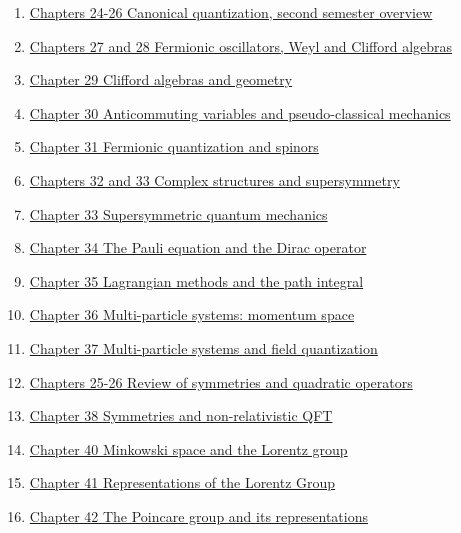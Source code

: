 \documentclass[11pt]{article}
\begin{document}
\begin{enumerate}
	\item	\href{https://mp.weixin.qq.com/s/1SBDkAsAP7Ov3OxvLwbe-g}{Chapters 24-26 Canonical quantization, second semester overview}	%
	\item	\href{https://mp.weixin.qq.com/s/I_jja5bSVY6yQx524kyoTQ}{Chapters 27 and 28 Fermionic oscillators, Weyl and Clifford algebras}	%
	\item	\href{https://mp.weixin.qq.com/s/zefOjiM-Weequ63_DQ9JWg}{Chapter 29 Clifford algebras and geometry} 	%
	\item 	\href{https://mp.weixin.qq.com/s/N3okmt1rshf2J26od2AvGQ}{Chapter 30 Anticommuting variables and pseudo-classical mechanics}	%
	\item 	\href{https://mp.weixin.qq.com/s/S3HAxmVX3YFLlGp7Skl44Q}{Chapter 31 Fermionic quantization and spinors}	%
	\item 	\href{https://mp.weixin.qq.com/s/nHh1YNanToykpK5zKwBfBQ}{Chapters 32 and 33 Complex structures and supersymmetry}	%
	\item 	\href{https://mp.weixin.qq.com/s/5YV2G3epflkIrEPUEVLVig}{Chapter 33 Supersymmetric quantum mechanics}	%
	\item 	\href{https://mp.weixin.qq.com/s/oEaCn-cgkR1csYRlqZJiXw}{Chapter 34 The Pauli equation and the Dirac operator}	%
	\item 	\href{https://mp.weixin.qq.com/s/j9NaXcWyvbgfSPYWFAoMwQ}{Chapter 35 Lagrangian methods and the path integral}	%
	\item 	\href{https://mp.weixin.qq.com/s/ot9_UC_IMNv5PCtrUTVPWg}{Chapter 36 Multi-particle systems: momentum space}	%
	\item	\href{https://mp.weixin.qq.com/s/aJE6pfXsPwbZjTM-ahAJiQ}{Chapter 37 Multi-particle systems and field quantization}	%
	\item	\href{https://mp.weixin.qq.com/s/l467_A37ENsAcv4EhsgG4g}{Chapters 25-26 Review of symmetries and quadratic operators}	%
	\item	\href{https://mp.weixin.qq.com/s/g-fZ4oO88VY-TuUPTF_h9w}{Chapter 38 Symmetries and non-relativistic QFT} 	%
	\item 	\href{https://mp.weixin.qq.com/s/wZxXqhnwkU6dsBl_XppwUg}{Chapter 40 Minkowski space and the Lorentz group}	%
	\item 	\href{https://mp.weixin.qq.com/s/v_VN1UioMIqHJGzDo8YidQ}{Chapter 41 Representations of the Lorentz Group}	%
	\item 	\href{https://mp.weixin.qq.com/s/3U4soyl-fU-xNr84BoRqjg}{Chapter 42 The Poincare group and its representations}	%

\end{enumerate}
\end{document}
